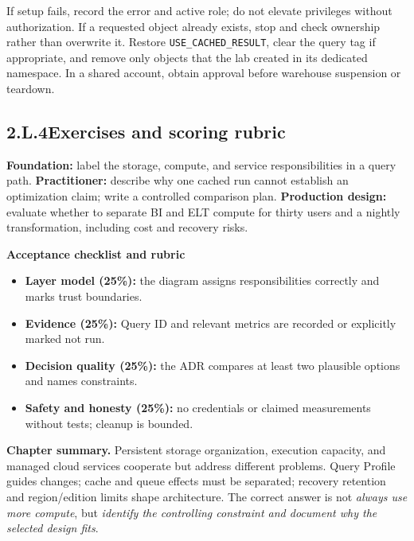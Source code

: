 \documentclass[11pt,twoside]{article}
\newcommand{\topic}[2]{\subsection*{#1\quad #2}}
\begin{document}
If setup fails, record the error and active role; do not elevate privileges without authorization. If a requested object already exists, stop and check ownership rather than overwrite it. Restore \texttt{USE\_CACHED\_RESULT}, clear the query tag if appropriate, and remove only objects that the lab created in its dedicated namespace. In a shared account, obtain approval before warehouse suspension or teardown.

\topic{2.L.4}{Exercises and scoring rubric}
\textbf{Foundation:} label the storage, compute, and service responsibilities in a query path. \textbf{Practitioner:} describe why one cached run cannot establish an optimization claim; write a controlled comparison plan. \textbf{Production design:} evaluate whether to separate BI and ELT compute for thirty users and a nightly transformation, including cost and recovery risks.

\begin{whitebox}
\textbf{Acceptance checklist and rubric}\par
\begin{itemize}
\item \textbf{Layer model (25\%):} the diagram assigns responsibilities correctly and marks trust boundaries.
\item \textbf{Evidence (25\%):} Query ID and relevant metrics are recorded or explicitly marked not run.
\item \textbf{Decision quality (25\%):} the ADR compares at least two plausible options and names constraints.
\item \textbf{Safety and honesty (25\%):} no credentials or claimed measurements without tests; cleanup is bounded.
\end{itemize}
\end{whitebox}

\textbf{Chapter summary.} Persistent storage organization, execution capacity, and managed cloud services cooperate but address different problems. Query Profile guides changes; cache and queue effects must be separated; recovery retention and region/edition limits shape architecture. The correct answer is not \emph{always use more compute}, but \emph{identify the controlling constraint and document why the selected design fits}.
\end{document}
